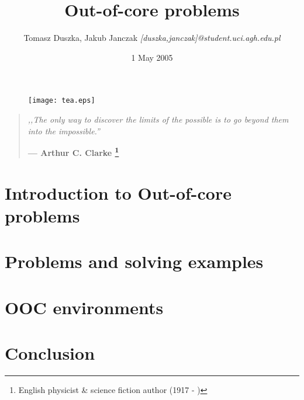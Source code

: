 \documentclass[12pt]{article}
\title{Out-of-core problems}
\author{Tomasz Duszka, Jakub Janczak \small{ \em{ [duszka,janczak]@student.uci.agh.edu.pl} } }
\date{1 May 2005}
\begin{document}
\maketitle

\smallskip
\begin{figure}[h!]
	\begin{center}
		\texttt{[image: tea.eps]}
	\end{center}
	\smallskip
\end{figure}

\begin{center}
\begin{quotation}
	\noindent \em{,,The only way to discover the limits of the possible is to go
	    beyond them into the impossible.''}\cite{2ndclarkelaw}

	\hfill \textbf{--- Arthur C. Clarke \footnote{English physicist \& science fiction author (1917 - )}} \\
\end{quotation}
\end{center}
\begin{abstract}

\end{abstract}

\section{Introduction to Out-of-core problems}



\section{Problems and solving examples}



\section{OOC environments}



\section{Conclusion}



\tableofcontents

\nocite{*}


\end{document}
